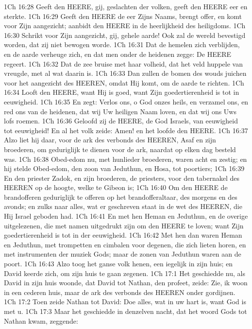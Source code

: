 1Ch 16:28  Geeft den HEERE, gij, geslachten der volken, geeft den HEERE eer en sterkte.
1Ch 16:29  Geeft den HEERE de eer Zijns Naams, brengt offer, en komt voor Zijn aangezicht; aanbidt den HEERE in de heerlijkheid des heiligdoms.
1Ch 16:30  Schrikt voor Zijn aangezicht, gij, gehele aarde! Ook zal de wereld bevestigd worden, dat zij niet bewogen worde.
1Ch 16:31  Dat de hemelen zich verblijden, en de aarde verheuge zich, en dat men onder de heidenen zegge: De HEERE regeert.
1Ch 16:32  Dat de zee bruise met haar volheid, dat het veld huppele van vreugde, met al wat daarin is.
1Ch 16:33  Dan zullen de bomen des wouds juichen voor het aangezicht des HEEREN, omdat Hij komt, om de aarde te richten.
1Ch 16:34  Looft den HEERE, want Hij is goed, want Zijn goedertierenheid is tot in eeuwigheid.
1Ch 16:35  En zegt: Verlos ons, o God onzes heils, en verzamel ons, en red ons van de heidenen, dat wij Uw heiligen Naam loven, en dat wij ons Uws lofs roemen.
1Ch 16:36  Geloofd zij de HEERE, de God Israels, van eeuwigheid tot eeuwigheid! En al het volk zeide: Amen! en het loofde den HEERE.
1Ch 16:37  Alzo liet hij daar, voor de ark des verbonds des HEEREN, Asaf en zijn broederen, om geduriglijk te dienen voor de ark, naardat op elken dag besteld was.
1Ch 16:38  Obed-edom nu, met hunlieder broederen, waren acht en zestig; en hij stelde Obed-edom, den zoon van Jeduthun, en Hosa, tot poortiers;
1Ch 16:39  En den priester Zadok, en zijn broederen, de priesters, voor den tabernakel des HEEREN op de hoogte, welke te Gibeon is;
1Ch 16:40  Om den HEERE de brandofferen geduriglijk te offeren op het brandofferaltaar, des morgens en des avonds; en zulks naar alles, wat er geschreven staat in de wet des HEEREN, die Hij Israel geboden had.
1Ch 16:41  En met hen Heman en Jeduthun, en de overige uitgelezenen, die met namen uitgedrukt zijn om den HEERE te loven; want Zijn goedertierenheid is tot in der eeuwigheid.
1Ch 16:42  Met hen dan waren Heman en Jeduthun, met trompetten en cimbalen voor degenen, die zich lieten horen, en met instrumenten der muziek Gods; maar de zonen van Jeduthun waren aan de poort.
1Ch 16:43  Alzo toog het ganse volk henen, een iegelijk in zijn huis; en David keerde zich, om zijn huis te gaan zegenen.
1Ch 17:1  Het geschiedde nu, als David in zijn huis woonde, dat David tot Nathan, den profeet, zeide: Zie, ik woon in een cederen huis, maar de ark des verbonds des HEEREN onder gordijnen.
1Ch 17:2  Toen zeide Nathan tot David: Doe alles, wat in uw hart is, want God is met u.
1Ch 17:3  Maar het geschiedde in denzelven nacht, dat het woord Gods tot Nathan kwam, zeggende:
